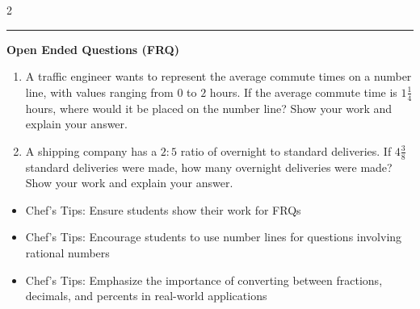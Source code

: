 \documentclass[10pt]{article}
\begin{document}
\begin{multicols}{2}
\begin{enumerate}[label=\textbf{Q\arabic*.}, leftmargin=*, itemsep=6pt, parsep=0pt]
\end{enumerate}
\end{multicols}

\vspace{-0.2cm}
\hrule
\vspace{0.2cm}
\textbf{\small Open Ended Questions (FRQ)}
\begin{enumerate}[label=\textbf{Q\arabic*.}, start=9, itemsep=5pt, topsep=0pt]

  \item \small A traffic engineer wants to represent the average commute times on a number line, with values ranging from $0$ to $2$ hours. If the average commute time is $1 \frac{1}{4}$ hours, where would it be placed on the number line? Show your work and explain your answer. \vspace{2cm}

  \item \small A shipping company has a $2:5$ ratio of overnight to standard deliveries. If $4 \frac{3}{8}$ standard deliveries were made, how many overnight deliveries were made? Show your work and explain your answer. \vspace{2cm}

\end{enumerate}

\vfill

\begin{tcolorbox}[colback=blue!5, colframe=mainblue!50, title=\small \textbf{Chef's Tips}, fonttitle=\bfseries, bottom=1mm]
\begin{itemize}[noitemsep, topsep=2pt, leftmargin=0.5cm]
  \item \scriptsize Chef's Tips: Ensure students show their work for FRQs\item \scriptsize Chef's Tips: Encourage students to use number lines for questions involving rational numbers\item \scriptsize Chef's Tips: Emphasize the importance of converting between fractions, decimals, and percents in real-world applications
\end{itemize}
\end{tcolorbox}
\end{document}
